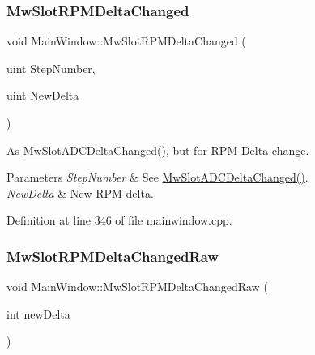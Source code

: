 \mbox{\label{class_main_window_a32b3a311b7151092db3ec0756d2c22d4}} 
\subsubsection{\texorpdfstring{Mw\+Slot\+R\+P\+M\+Delta\+Changed}{MwSlotRPMDeltaChanged}}
{\footnotesize\ttfamily void Main\+Window\+::\+Mw\+Slot\+R\+P\+M\+Delta\+Changed (\begin{DoxyParamCaption}\item[{uint}]{Step\+Number,  }\item[{uint}]{New\+Delta }\end{DoxyParamCaption})\hspace{0.3cm}{\ttfamily [slot]}}



As \hyperlink{class_main_window_a5778840f76f8ce6edd63d84b57b801b1}{Mw\+Slot\+A\+D\+C\+Delta\+Changed()}, but for R\+PM Delta change. 


\begin{DoxyParams}{Parameters}
{\em Step\+Number} & See \hyperlink{class_main_window_a5778840f76f8ce6edd63d84b57b801b1}{Mw\+Slot\+A\+D\+C\+Delta\+Changed()}. \\
\hline
{\em New\+Delta} & New R\+PM delta. \\
\hline
\end{DoxyParams}


Definition at line 346 of file mainwindow.\+cpp.

\mbox{\label{class_main_window_a4480e7516f91b93c8abc3d42c1284124}} 
\subsubsection{\texorpdfstring{Mw\+Slot\+R\+P\+M\+Delta\+Changed\+Raw}{MwSlotRPMDeltaChangedRaw}}
{\footnotesize\ttfamily void Main\+Window\+::\+Mw\+Slot\+R\+P\+M\+Delta\+Changed\+Raw (\begin{DoxyParamCaption}\item[{int}]{new\+Delta }\end{DoxyParamCaption})\hspace{0.3cm}{\ttfamily [slot]}}




